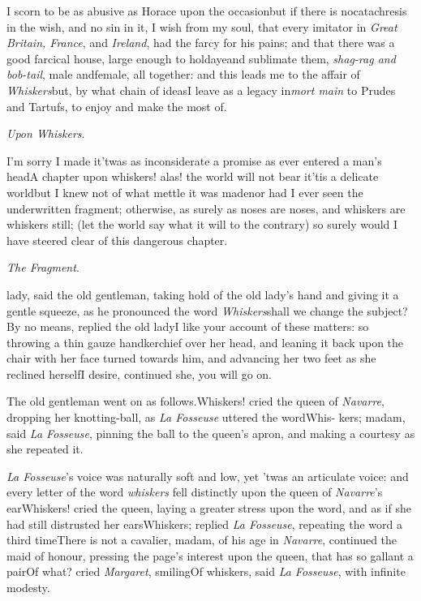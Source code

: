\documentclass{article}
\begin{document}
I scorn to be as abusive as Horace upon the
occasion\tsh but if there is no\break catachresis in the wish,
and no sin in it, I wish from my soul, that every imitator in
\textit{Great Britain, France}, and \textit{Ireland}, had the farcy for
his pains; and that there was a good farcical house, large enough
to hold\tsk aye\tsk and sublimate them, \textit{shag-rag and
bob-tail}, male and\break female, all together: and this leads me to
the affair of \textit{Whiskers}\tsh but, by what chain of
ideas\tsk I leave as a legacy in\break \textit{mort main} to Prudes and
Tartufs, to enjoy and make the most of.

\bigskip
\centerline{\textit{Upon Whiskers}.}

I’m sorry I made it\tsh ’twas as
inconsiderate a promise as ever entered a man’s
head\tsh A chapter upon whiskers! alas! the world will not
bear it\tsk ’tis a delicate world\tsk but I knew
not of what mettle it was made\tsk nor had I ever seen the
underwritten fragment; otherwise, as surely as noses are noses,
and whiskers are whiskers still; (let the world say what it will to
the contrary) so surely would I have steered clear of this
dangerous chapter.

\noindent
\centerline{\textit{The Fragment}.}
\stick{\astfill}
\stick{\astfill}
lady, said the old gentleman, taking\break
hold of the old lady’s hand and giving\break
it a gentle squeeze, as he pronounced\break
the word \textit{Whiskers}\tsh shall we change\break
the subject? By no means, replied the\break
old lady\tsk I like your account of these\break
matters: so throwing a thin gauze\break
handkerchief over her head, and leaning\break
it back upon the chair with her face\break
turned towards him, and advancing her\break
two feet as she reclined herself\tsk I desire,\break
continued she, you will go on.

The old gentleman went on as follows.\break\tsh Whiskers!
cried the queen of \textit{Navarre}, dropping her knotting-ball, as
\textit{La Fosseuse} uttered the word\tsh Whis- kers; madam,
said \textit{La Fosseuse}, pinning the ball to the queen’s
apron, and making a courtesy as she repeated it.

\textit{La Fosseuse}’s voice was naturally soft and low, yet
’twas an articulate voice: and every letter of the word
\textit{whiskers} fell distinctly upon the queen of
\textit{Navarre}’s ear\tsk Whiskers! cried the queen, laying
a greater stress upon the word, and as if she had still distrusted
her ears\tsk Whiskers; replied \textit{La Fosseuse},
repeating the word a third time\tsk There is not a
cavalier, madam, of his age in \textit{Navarre}, continued the maid
of honour, pressing the page’s interest upon the queen, that
has so gallant a pair\tsk Of what? cried
\textit{Margaret}, smiling\tsh Of whiskers, said \textit{La Fosseuse},
with infinite modesty.
\end{document}
